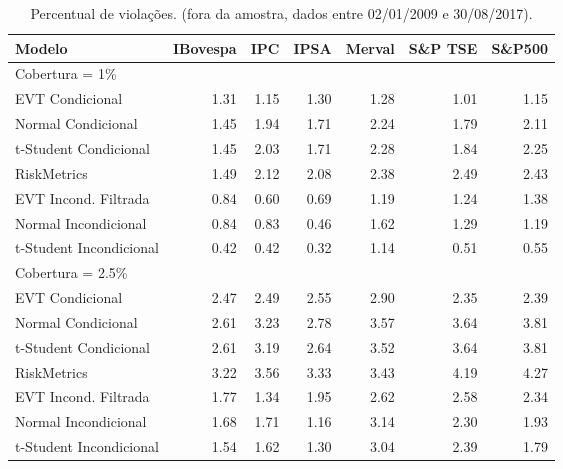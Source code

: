 \begin{table}[H]
\centering
\caption{Percentual de violações. (fora da amostra, dados entre 02/01/2009 e 30/08/2017).} 
\label{tab:varviol}
\begin{tabular}{lrrrrrr}
  \hline
Modelo & IBovespa & IPC & IPSA & Merval & S\&P TSE & S\&P500 \\ 
  \hline
Cobertura = 1\% &  &  &  &  &  &  \\ 
  EVT Condicional & 1.31 & 1.15 & 1.30 & 1.28 & 1.01 & 1.15 \\ 
  Normal Condicional & 1.45 & 1.94 & 1.71 & 2.24 & 1.79 & 2.11 \\ 
  t-Student Condicional & 1.45 & 2.03 & 1.71 & 2.28 & 1.84 & 2.25 \\ 
  RiskMetrics & 1.49 & 2.12 & 2.08 & 2.38 & 2.49 & 2.43 \\ 
  EVT Incond. Filtrada & 0.84 & 0.60 & 0.69 & 1.19 & 1.24 & 1.38 \\ 
  Normal Incondicional & 0.84 & 0.83 & 0.46 & 1.62 & 1.29 & 1.19 \\ 
  t-Student Incondicional & 0.42 & 0.42 & 0.32 & 1.14 & 0.51 & 0.55 \\ 
  Cobertura = 2.5\% &  &  &  &  &  &  \\ 
  EVT Condicional & 2.47 & 2.49 & 2.55 & 2.90 & 2.35 & 2.39 \\ 
  Normal Condicional & 2.61 & 3.23 & 2.78 & 3.57 & 3.64 & 3.81 \\ 
  t-Student Condicional & 2.61 & 3.19 & 2.64 & 3.52 & 3.64 & 3.81 \\ 
  RiskMetrics & 3.22 & 3.56 & 3.33 & 3.43 & 4.19 & 4.27 \\ 
  EVT Incond. Filtrada & 1.77 & 1.34 & 1.95 & 2.62 & 2.58 & 2.34 \\ 
  Normal Incondicional & 1.68 & 1.71 & 1.16 & 3.14 & 2.30 & 1.93 \\ 
  t-Student Incondicional & 1.54 & 1.62 & 1.30 & 3.04 & 2.39 & 1.79 \\ 
   \hline
\end{tabular}
\end{table}

